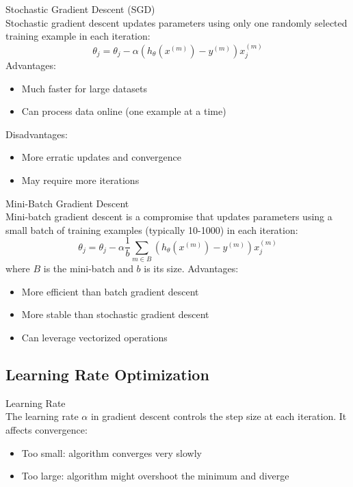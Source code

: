 \begin{definition}{Stochastic Gradient Descent (SGD)}\\
Stochastic gradient descent updates parameters using only one randomly selected training example in each iteration:
\[\theta_j = \theta_j - \alpha (h_\theta(x^{(m)}) - y^{(m)})x^{(m)}_j\]
Advantages:
\begin{itemize}
    \item Much faster for large datasets
    \item Can process data online (one example at a time)
\end{itemize}
Disadvantages:
\begin{itemize}
    \item More erratic updates and convergence
    \item May require more iterations
\end{itemize}
\end{definition}

\begin{definition}{Mini-Batch Gradient Descent}\\
Mini-batch gradient descent is a compromise that updates parameters using a small batch of training examples (typically 10-1000) in each iteration:
\[\theta_j = \theta_j - \alpha \frac{1}{b}\sum_{m \in B}(h_\theta(x^{(m)}) - y^{(m)})x^{(m)}_j\]
where $B$ is the mini-batch and $b$ is its size.
Advantages:
\begin{itemize}
    \item More efficient than batch gradient descent
    \item More stable than stochastic gradient descent
    \item Can leverage vectorized operations
\end{itemize}
\end{definition}

\subsection{Learning Rate Optimization}

\begin{definition}{Learning Rate}\\
The learning rate $\alpha$ in gradient descent controls the step size at each iteration. It affects convergence:
\begin{itemize}
    \item Too small: algorithm converges very slowly
    \item Too large: algorithm might overshoot the minimum and diverge
\end{itemize}
\end{definition}

